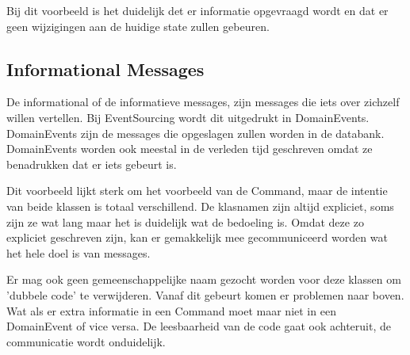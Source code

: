 
Bij dit voorbeeld is het duidelijk det er informatie opgevraagd wordt en dat er geen wijzigingen aan de huidige state zullen gebeuren.

\subsection{Informational Messages}
\label{subsec:informational-messages}

De informational of de informatieve messages, zijn messages die iets over zichzelf willen vertellen. Bij EventSourcing wordt dit uitgedrukt in DomainEvents. DomainEvents zijn de messages die opgeslagen zullen worden in de databank. DomainEvents worden ook meestal in de verleden tijd geschreven omdat ze benadrukken dat er iets gebeurt is.


Dit voorbeeld lijkt sterk om het voorbeeld van de Command, maar de intentie van beide klassen is totaal verschillend. De klasnamen zijn altijd expliciet, soms zijn ze wat lang maar het is duidelijk wat de bedoeling is. Omdat deze zo expliciet geschreven zijn, kan er gemakkelijk mee gecommuniceerd worden wat het hele doel is van messages.

Er mag ook geen gemeenschappelijke naam gezocht worden voor deze klassen om 'dubbele code' te verwijderen. Vanaf dit gebeurt komen er problemen naar boven. Wat als er extra informatie in een Command moet maar niet in een DomainEvent of vice versa. De leesbaarheid van de code gaat ook achteruit, de communicatie wordt onduidelijk.
